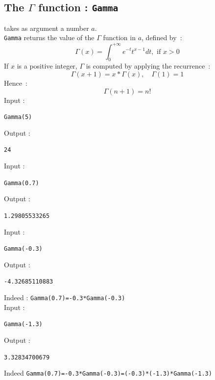 \documentclass[a4paper,11pt]{book}
\begin{document}
\subsection{The $\Gamma$ function : {\tt Gamma}}
 takes as argument a number $a$.\\
{\tt Gamma} returns the value of the $\Gamma$ function in $a$, defined by~:
\[ \Gamma(x)=\int_0^{+\infty}e^{-t}t^{x-1}dt, \mbox{ if } x>0 \]
If $x$ is a positive integer, $\Gamma$ is computed by applying
the recurrence~:
\[ \Gamma(x+1)=x*\Gamma(x), \quad \Gamma(1)=1 \]
Hence~:
\[ \Gamma(n+1)=n! \]
Input :
\begin{center}{\tt Gamma(5)}\end{center}
Output :
\begin{center}{\tt 24}\end{center}
Input :
\begin{center}{\tt Gamma(0.7)}\end{center}
Output :
\begin{center}{\tt 1.29805533265}\end{center}
Input :
\begin{center}{\tt Gamma(-0.3)}\end{center}
Output :
\begin{center}{\tt -4.32685110883}\end{center}
Indeed : {\tt Gamma(0.7)=-0.3*Gamma(-0.3)}\\
Input :
\begin{center}{\tt Gamma(-1.3)}\end{center}
Output :
\begin{center}{\tt 3.32834700679}\end{center}
Indeed {\tt Gamma(0.7)=-0.3*Gamma(-0.3)=(-0.3)*(-1.3)*Gamma(-1.3)}
\end{document}
